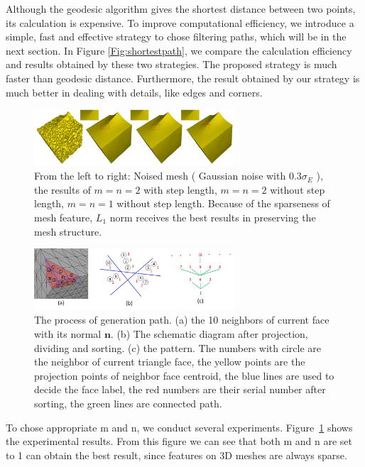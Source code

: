 Although the geodesic algorithm gives the shortest distance between two points, its calculation is expensive.
To improve computational efficiency, we introduce a simple, fast and effective strategy to chose filtering paths, which will be in the next section.
In Figure \ref{Fig:shortestpath}, we compare the calculation efficiency and results obtained by these two strategies.
The proposed strategy is much faster than geodesic distance.
Furthermore, the result obtained by our strategy is much better in dealing with details, like edges and corners.

\begin{figure}%
\centering
\includegraphics[width = 7.5cm]{results/Norm/norm.jpg}
\vspace{0.5mm}
\caption{ From the left to right: Noised mesh ( Gaussian noise with 0.3$\sigma_E$ ), the results of $m = n = 2$ with step length,
$m = n = 2$ without step length, $m = n = 1$ without step length.
Because of the sparseness of mesh feature, $L_1$ norm receives the best results in preserving the mesh structure.}
\label{Fig:norm}
\end{figure}

\begin{figure}
\centering
\includegraphics[width = 7.5cm]{results/Path/path1.jpg}
\vspace{-3mm}
\caption{ The process of generation path. (a) the 10 neighbors of current face with its normal $\mathbf{n}$. (b) The schematic diagram after projection, dividing and sorting. (c) the pattern.
The numbers with circle are the neighbor of current triangle face, the yellow points are the projection points of neighbor face centroid, the blue lines are used to decide the face label, the red numbers are their serial number after sorting, the green lines are connected path.}
\label{Fig:path}
\end{figure}

To chose appropriate m and n,  we conduct several experiments.
Figure~\ref{Fig:norm} shows the experimental results.
From this figure we can see that both m and n are set to 1 can obtain the best result, since features on 3D meshes are always sparse.


